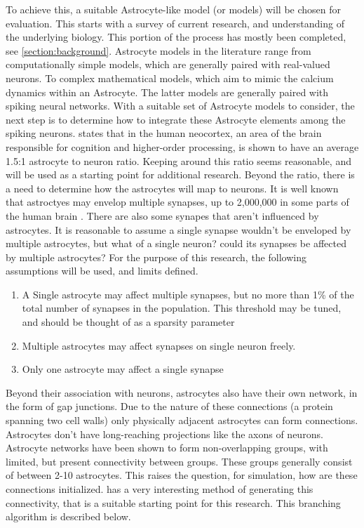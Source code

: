     To achieve this, a suitable Astrocyte-like model (or models) will be chosen for evaluation. This starts with a survey of current research, and understanding of the underlying biology. This portion of the process has mostly been completed, see \ref{section:background}. Astrocyte models in the literature range from computationally simple models, which are generally paired with real-valued neurons. To complex mathematical models, which aim to mimic the calcium dynamics within an Astrocyte. The latter models are generally paired with spiking neural networks. With a suitable set of Astrocyte models to consider, the next step is to determine how to integrate these Astrocyte elements among the spiking neurons. \cite{sgnn_transistor} states that in the human neocortex, an area of the brain responsible for cognition and higher-order processing, is shown to have an average 1.5:1 astrocyte to neuron ratio. Keeping around this ratio seems reasonable, and will be used as a starting point for additional research. Beyond the ratio, there is a need to determine how the astrocytes will map to neurons. It is well known that astroctyes may envelop multiple synapses, up to 2,000,000 in some parts of the human brain \cite{mederos_2018}. There are also some synapes that aren't influenced by astrocytes. It is reasonable to assume a single synapse wouldn't be enveloped by multiple astrocytes, but what of a single neuron? could its synapses be affected by multiple astrocytes? For the purpose of this research, the following assumptions will be used, and limits defined.
    
    \begin{enumerate}
        \item A Single astrocyte may affect multiple synapses, but no more than 1\% of the total number of synapses in the population. This threshold may be tuned, and should be thought of as a sparsity parameter
        \item Multiple astrocytes may affect synapses on single neuron freely.
        \item Only one astrocyte may affect a single synapse
    \end{enumerate}
    
    Beyond their association with neurons, astrocytes also have their own network, in the form of gap junctions. Due to the nature of these connections (a protein spanning two cell walls) only physically adjacent astrocytes can form connections. Astrocytes don't have long-reaching projections like the axons of neurons. Astrocyte networks have been shown to form non-overlapping groups, with limited, but present connectivity between groups. These groups generally consist of between 2-10 astrocytes. This raises the question, for simulation, how are these connections initialized. \cite{snn_dynamic_calcium} has a very interesting method of generating this connectivity, that is a suitable starting point for this research. This branching algorithm is described below.
    
